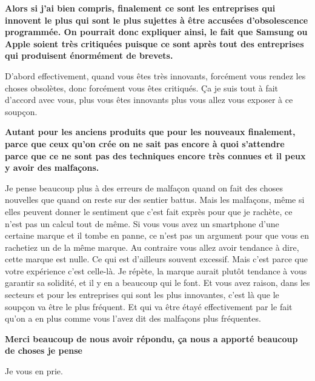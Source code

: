 \begin{small}
\textbf{Alors si j'ai bien compris, finalement ce sont les entreprises qui innovent le plus qui sont le plus sujettes à être accusées d'obsolescence programmée. On pourrait donc expliquer ainsi, le fait que Samsung ou Apple soient très critiquées puisque ce sont après tout des entreprises qui produisent énormément de brevets. }
\smallbreak


D'abord effectivement, quand vous êtes très innovants, forcément vous rendez les choses obsolètes, donc forcément vous êtes critiqués. Ça je suis tout à fait d'accord avec vous, plus vous êtes innovants plus vous allez vous exposer à ce soupçon. 

\textbf{Autant pour les anciens produits que pour les nouveaux finalement, parce que ceux qu'on crée on ne sait pas encore à quoi s'attendre parce que ce ne sont pas des  techniques  encore très connues et il peux y avoir des malfaçons.}
\smallbreak


Je pense beaucoup plus à des erreurs de malfaçon quand on fait des choses nouvelles que quand on reste sur des sentier battus. Mais les malfaçons, même si elles peuvent donner le sentiment que c'est fait exprès pour que je rachète, ce n'est pas un calcul tout de même. Si vous vous avez un smartphone d'une certaine marque et il tombe en panne, ce n'est pas un argument pour que vous en rachetiez un de la même marque. Au contraire vous allez avoir tendance à dire, cette marque est nulle. Ce qui est d'ailleurs souvent excessif. Mais c'est parce que votre expérience c'est celle-là. Je répète, la marque aurait plutôt tendance à vous garantir sa solidité, et il y en a beaucoup qui le font. Et vous avez raison, dans les secteurs et pour les entreprises qui sont les plus innovantes, c'est là que le soupçon va être le plus fréquent. Et qui va être étayé effectivement par le fait qu'on a en plus comme vous l'avez dit des malfaçons plus fréquentes. 

\textbf{Merci beaucoup de nous avoir répondu, ça nous a apporté beaucoup de choses je pense}
\smallbreak


Je vous en prie.

\end{small}